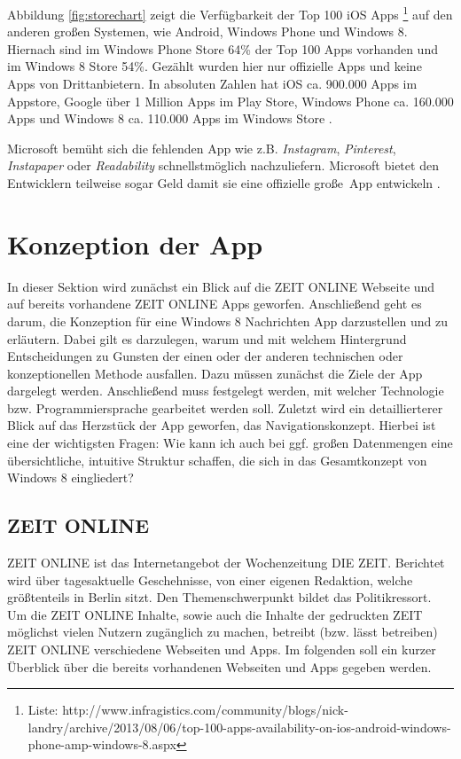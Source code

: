 \documentclass[12pt,a4paper,bibtotoc,abstracton]{scrartcl}
\begin{document}
Abbildung \ref{fig:storechart} zeigt die Verfügbarkeit der Top 100 iOS Apps \footnote{Liste: http://www.infragistics.com/community/blogs/nick-landry/archive/2013/08/06/top-100-apps-availability-on-ios-android-windows-phone-amp-windows-8.aspx} auf den anderen großen Systemen, wie Android, Windows Phone und Windows 8. Hiernach sind im Windows Phone Store 64\% der Top 100 Apps vorhanden und im Windows 8 Store 54\%. Gezählt wurden hier nur offizielle Apps und keine Apps von Drittanbietern. In absoluten Zahlen hat iOS ca. 900.000 Apps im Appstore, Google über 1 Million Apps im Play Store, Windows Phone ca. 160.000 Apps und Windows 8 ca. 110.000 Apps im Windows Store \citep{WinbetaStore2013}.

Microsoft bemüht sich die fehlenden App wie z.B. \textit{Instagram}, \textit{Pinterest}, \textit{Instapaper} oder \textit{Readability} schnellstmöglich nachzuliefern. Microsoft bietet den Entwicklern teilweise sogar Geld damit sie eine offizielle \glqq große\grqq\ App entwickeln \citep{WinbetaStore2013}.


\newpage
\section{Konzeption der App}
\label{sec:konzeption}
In dieser Sektion wird zunächst ein Blick auf die ZEIT ONLINE Webseite und auf bereits vorhandene ZEIT ONLINE Apps geworfen. Anschließend geht es darum, die Konzeption für eine Windows 8 Nachrichten App darzustellen und zu erläutern. Dabei gilt es darzulegen, warum und mit welchem Hintergrund Entscheidungen zu Gunsten der einen oder der anderen technischen oder konzeptionellen Methode ausfallen. Dazu müssen zunächst die Ziele der App dargelegt werden. Anschließend muss festgelegt werden, mit welcher Technologie bzw. Programmiersprache gearbeitet werden soll. Zuletzt wird ein detaillierterer Blick auf das Herzstück der App geworfen, das Navigationskonzept. Hierbei ist eine der wichtigsten Fragen: \glqq Wie kann ich auch bei ggf. großen Datenmengen eine übersichtliche, intuitive Struktur schaffen, die sich in das Gesamtkonzept von Windows 8 eingliedert?\grqq  

\subsection{ZEIT ONLINE}
\label{subsec:zeitonline}
ZEIT ONLINE ist das Internetangebot der Wochenzeitung DIE ZEIT. Berichtet wird über tagesaktuelle Geschehnisse, von einer eigenen Redaktion, welche größtenteils in Berlin sitzt. Den Themenschwerpunkt bildet das Politikressort. Um die ZEIT ONLINE Inhalte, sowie auch die Inhalte der gedruckten ZEIT möglichst vielen Nutzern zugänglich zu machen, betreibt (bzw. lässt betreiben) ZEIT ONLINE verschiedene Webseiten und Apps. Im folgenden soll ein kurzer Überblick über die bereits vorhandenen Webseiten und Apps gegeben werden.
\end{document}
